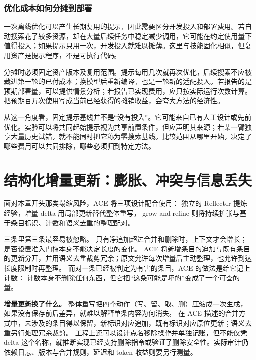 \subsubsection{优化成本如何分摊到部署}

一次离线优化可以产生长期复用的提示，因此需要区分开发投入和部署费用。若自动搜索花了较多资源，却在大量后续任务中稳定减少调用，它可能在约定使用量下值得投入；如果提示只用一次，开发投入就难以摊薄。这里与技能固化相似，但复用资产是提示程序，不是可执行代码。

分摊时必须固定资产版本及复用范围。提示每用几次就再次优化，后续搜索不应被藏进第一轮的已付成本；换模型后重新编译，也是一轮新的适配投入。若报告的是预期部署量，可以提供情景分析；若报告已实现费用，应只按实际运行次数计算。把预期百万次使用写成当前已经获得的摊销收益，会夸大方法的经济性。

从这一角度看，固定提示基线并不是“没有投入”。它可能来自已有人工设计或先前优化。实验可以将共同起始提示视为共享前置条件，但应声明其来源；若某一臂独享大量历史试错，就不能同时把它称为零搜索基线。比较范围从哪里开始，决定了哪些费用可以共同排除，哪些必须归到特定方法。


\section{结构化增量更新：膨胀、冲突与信息丢失}
\label{sec:ch07-delta}



面对本章开头那类塌缩风险，ACE 将三项设计配合使用：
独立的 Reflector 提炼经验，增量 delta 用局部更新替代整体重写，
grow-and-refine 则将持续扩张与基于条目标识、计数和语义去重的整理配对\cite{ace-2510}。

三条里第三条最容易被忽略。
只有净追加超过合并和删除时，上下文才会增长；是否设置准入门槛本身不能决定长度的变化。
ACE 将新增条目的追加与既有条目的更新分开，并用语义去重裁剪冗余；原文允许每次增量后主动整理，也允许到达长度限制时再整理。
而对一条已经被判定为有害的条目，ACE 的做法是给它记上计数\cite{ace-2510}：
计数本身不删除任何东西，但它把``这条可能是坏的''变成了一个可查的量。

\begin{principlebox}
\textbf{增量更新换了什么。}
整体重写把四个动作（写、留、取、删）压缩成一次生成，
如果没有保存前后差异，就难以解释单条内容为何消失。
在 ACE 描述的合并方式中，未涉及的条目得以保留，新标识对应追加，既有标识对应原位更新；语义去重另行处理冗余裁剪。
工程上还可以设计点名移除操作并单独记账，但不能仅凭 delta 这个名称，就推断实现已经支持删除指令或验证了删除安全性。实际审计仍依赖日志、版本与合并规则，延迟和 token 收益则要另行测量。
\end{principlebox}

